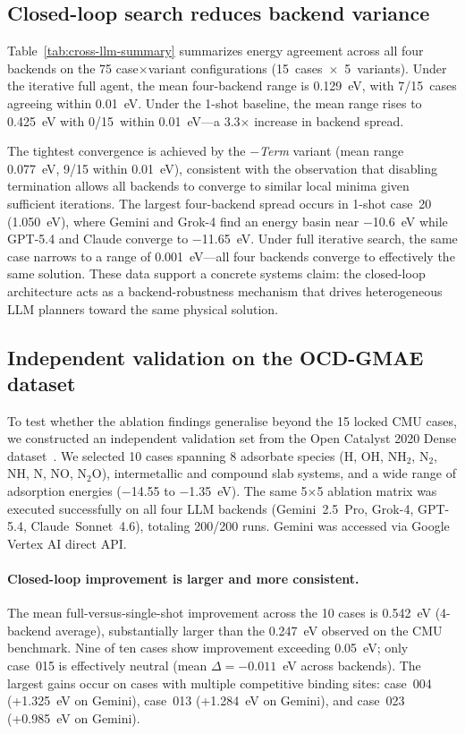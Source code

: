 \subsection{Closed-loop search reduces backend variance}

Table~\ref{tab:cross-llm-summary} summarizes energy agreement across all four backends on the 75 case$\times$variant configurations (15~cases~$\times$~5~variants).
Under the iterative full agent, the mean four-backend range is 0.129~eV, with 7/15~cases agreeing within 0.01~eV.
Under the 1-shot baseline, the mean range rises to 0.425~eV with 0/15~within 0.01~eV---a 3.3$\times$ increase in backend spread.

The tightest convergence is achieved by the \textit{$-$Term} variant (mean range 0.077~eV, 9/15 within 0.01~eV), consistent with the observation that disabling termination allows all backends to converge to similar local minima given sufficient iterations.
The largest four-backend spread occurs in 1-shot case~20 (1.050~eV), where Gemini and Grok-4 find an energy basin near $-$10.6~eV while GPT-5.4 and Claude converge to $-$11.65~eV.
Under full iterative search, the same case narrows to a range of 0.001~eV---all four backends converge to effectively the same solution.
These data support a concrete systems claim: the closed-loop architecture acts as a backend-robustness mechanism that drives heterogeneous LLM planners toward the same physical solution.

\subsection{Independent validation on the OCD-GMAE dataset}

To test whether the ablation findings generalise beyond the 15 locked CMU cases, we constructed an independent validation set from the Open Catalyst 2020 Dense dataset~\cite{lan2023adsorbml}.
We selected 10 cases spanning 8 adsorbate species (H, OH, NH$_2$, N$_2$, NH, N, NO, N$_2$O), intermetallic and compound slab systems, and a wide range of adsorption energies ($-$14.55 to $-$1.35~eV).
The same 5$\times$5 ablation matrix was executed successfully on all four LLM backends (Gemini~2.5~Pro, Grok-4, GPT-5.4, Claude~Sonnet~4.6), totaling 200/200 runs. Gemini was accessed via Google Vertex AI direct API.



\paragraph{Closed-loop improvement is larger and more consistent.}
The mean full-versus-single-shot improvement across the 10 cases is 0.542~eV (4-backend average), substantially larger than the 0.247~eV observed on the CMU benchmark.
Nine of ten cases show improvement exceeding 0.05~eV; only case~015 is effectively neutral (mean $\Delta = -0.011$~eV across backends).
The largest gains occur on cases with multiple competitive binding sites: case~004 (+1.325~eV on Gemini), case~013 (+1.284~eV on Gemini), and case~023 (+0.985~eV on Gemini).

